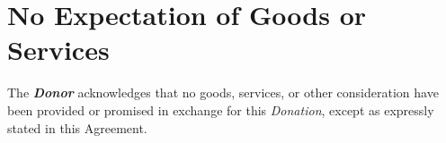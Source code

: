 
\section{No Expectation of Goods or Services}
\label{sec:expectation}

The \textbf{\textit{Donor}} acknowledges that no goods, services, or other consideration have been provided or promised in exchange for this \textit{Donation}, except as expressly stated in this Agreement.

